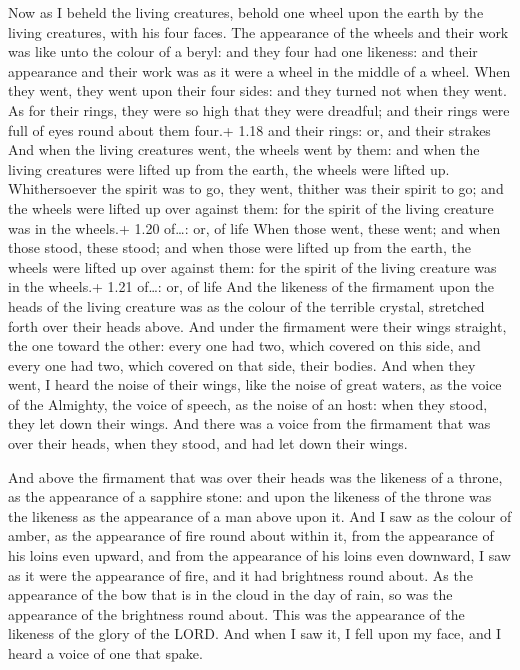  Now as I beheld the living creatures, behold one wheel
upon the earth by the living creatures, with his four faces.
 The appearance of the wheels and their work was like unto
the colour of a beryl: and they four had one likeness: and their
appearance and their work was as it were a wheel in the middle of a
wheel.  When they went, they went upon their four sides:
and they turned not when they went.  As for their rings,
they were so high that they were dreadful; and their rings were full of
eyes round about them four.+ 1.18 and their rings: or, and their strakes
 And when the living creatures went, the wheels went by
them: and when the living creatures were lifted up from the earth, the
wheels were lifted up.  Whithersoever the spirit was to go,
they went, thither was their spirit to go; and the wheels were lifted up
over against them: for the spirit of the living creature was in the
wheels.+ 1.20 of\ldots: or, of life  When those went, these
went; and when those stood, these stood; and when those were lifted up
from the earth, the wheels were lifted up over against them: for the
spirit of the living creature was in the wheels.+ 1.21 of\ldots: or, of
life  And the likeness of the firmament upon the heads of
the living creature was as the colour of the terrible crystal, stretched
forth over their heads above.  And under the firmament were
their wings straight, the one toward the other: every one had two, which
covered on this side, and every one had two, which covered on that side,
their bodies.  And when they went, I heard the noise of
their wings, like the noise of great waters, as the voice of the
Almighty, the voice of speech, as the noise of an host: when they stood,
they let down their wings.  And there was a voice from the
firmament that was over their heads, when they stood, and had let down
their wings.

 And above the firmament that was over their heads was
the likeness of a throne, as the appearance of a sapphire stone: and
upon the likeness of the throne was the likeness as the appearance of a
man above upon it.  And I saw as the colour of amber, as
the appearance of fire round about within it, from the appearance of his
loins even upward, and from the appearance of his loins even downward, I
saw as it were the appearance of fire, and it had brightness round
about.  As the appearance of the bow that is in the cloud
in the day of rain, so was the appearance of the brightness round about.
This was the appearance of the likeness of the glory of the LORD. And
when I saw it, I fell upon my face, and I heard a voice of one that
spake.

